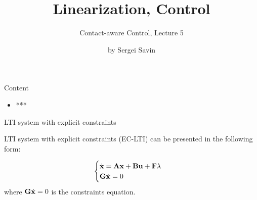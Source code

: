 \documentclass{beamer}
\title{Linearization, Control}
\subtitle{Contact-aware Control, Lecture 5}
\author{by Sergei Savin}
\date{\mydate}
\begin{document}
\maketitle


\begin{frame}{Content}

\begin{itemize}
\item ***
\end{itemize}

\end{frame}




\begin{frame}{LTI system with explicit constraints}
	\begin{flushleft}
		
		LTI system with explicit constraints (EC-LTI) can be presented in the following form:
		
		\begin{equation}
			\begin{cases}
				\dot{\mathbf{x}}=\mathbf{A}\mathbf{x}+\mathbf{B}\mathbf{u}+\mathbf{F}\lambda 
				\\
				\mathbf{G}\dot{\mathbf{x}}=0
			\end{cases}
		\end{equation}
		where $\mathbf{G}\dot{\mathbf{x}}=0$ is the constraints equation.
	
	\end{flushleft}
\end{frame}
\end{document}
